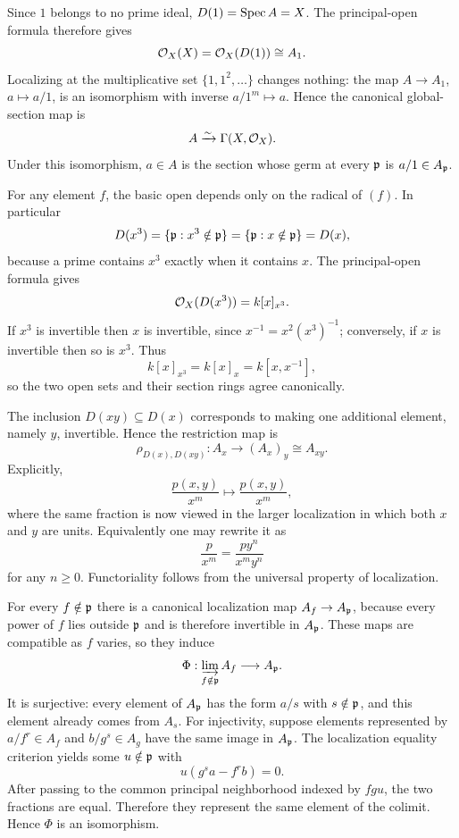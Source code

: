 
\begin{solution}[Exercise VI.17.1]
Since $1$ belongs to no prime ideal, $D(1)=\operatorname{Spec} A=X$.  The principal-open formula therefore gives
\[
\mathcal O_X(X)=\mathcal O_X(D(1))\cong A_1.
\]
Localizing at the multiplicative set $\{1,1^2,\dots\}$ changes nothing: the map $A\to A_1$, $a\mapsto a/1$, is an isomorphism with inverse $a/1^m\mapsto a$.  Hence the canonical global-section map is
\[
A\xrightarrow{\sim}\Gamma(X,\mathcal O_X).
\]
Under this isomorphism, $a\in A$ is the section whose germ at every $\mathfrak p$ is $a/1\in A_{\mathfrak p}$.
\end{solution}

\begin{solution}[Exercise VI.17.2]
For any element $f$, the basic open depends only on the radical of $(f)$.  In particular
\[
D(x^3)=\{\mathfrak p:x^3\notin\mathfrak p\}=\{\mathfrak p:x\notin\mathfrak p\}=D(x),
\]
because a prime contains $x^3$ exactly when it contains $x$.
The principal-open formula gives
\[
\mathcal O_X(D(x^3))=k[x]_{x^3}.
\]
If $x^3$ is invertible then $x$ is invertible, since $x^{-1}=x^2(x^3)^{-1}$; conversely, if $x$ is invertible then so is $x^3$.  Thus
\[
k[x]_{x^3}=k[x]_x=k[x,x^{-1}],
\]
so the two open sets and their section rings agree canonically.
\end{solution}

\begin{solution}[Exercise VI.17.3]
The inclusion $D(xy)\subseteq D(x)$ corresponds to making one additional element, namely $y$, invertible.  Hence the restriction map is
\[
\rho_{D(x),D(xy)}:A_x\longrightarrow (A_x)_y\cong A_{xy}.
\]
Explicitly,
\[
\frac{p(x,y)}{x^m}\longmapsto \frac{p(x,y)}{x^m},
\]
where the same fraction is now viewed in the larger localization in which both $x$ and $y$ are units.  Equivalently one may rewrite it as
\[
\frac{p}{x^m}=\frac{p y^n}{x^m y^n}
\]
for any $n\ge0$.  Functoriality follows from the universal property of localization.
\end{solution}

\begin{solution}[Exercise VI.17.4]
For every $f\notin\mathfrak p$ there is a canonical localization map $A_f\to A_{\mathfrak p}$, because every power of $f$ lies outside $\mathfrak p$ and is therefore invertible in $A_{\mathfrak p}$.  These maps are compatible as $f$ varies, so they induce
\[
\Phi:\varinjlim_{f\notin\mathfrak p}A_f\longrightarrow A_{\mathfrak p}.
\]
It is surjective: every element of $A_{\mathfrak p}$ has the form $a/s$ with $s\notin\mathfrak p$, and this element already comes from $A_s$.
For injectivity, suppose elements represented by $a/f^r\in A_f$ and $b/g^s\in A_g$ have the same image in $A_{\mathfrak p}$.  The localization equality criterion yields some $u\notin\mathfrak p$ with
\[
u(g^s a-f^r b)=0.
\]
After passing to the common principal neighborhood indexed by $fgu$, the two fractions are equal.  Therefore they represent the same element of the colimit.  Hence $\Phi$ is an isomorphism.
\end{solution}

